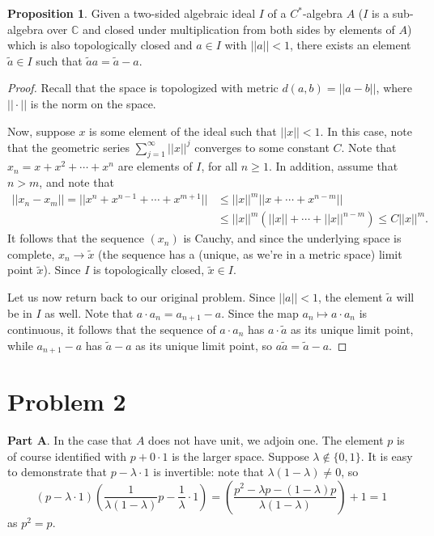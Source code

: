 \documentclass[aps,pra,showpacs,notitlepage,onecolumn,superscriptaddress,nofootinbib]{revtex4-1}
\newcommand{\hhrulefill}{\hspace{-1.0em}\hrulefill}
\theoremstyle{definition}
\newtheorem{proposition}{Proposition}[section]
\begin{document}
\begin{proposition}
  Given a two-sided algebraic ideal $I$ of a $C^{*}$-algebra $A$ ($I$ is a sub-algebra over $\mathbb{C}$ and closed under multiplication from both sides by elements of $A$) which is also topologically closed and $a \in I$ with $||a|| < 1$, there exists an
  element $\widetilde{a} \in I$ such that $\widetilde{a} a = \widetilde{a} - a$.
\end{proposition}

\begin{proof}
  Recall that the space is topologized with metric $d(a, b) = ||a - b||$, where $||\cdot||$ is the norm on the space.

  Now, suppose $x$ is some element of the ideal such that
  $||x|| < 1$. In this case, note that the geometric series $\sum_{j = 1}^{\infty} ||x||^{j}$ converges to some constant $C$.
  Note that $x_n = x + x^2 + \cdots + x^{n}$ are elements of $I$, for all $n \geq 1$. In addition, assume that $n > m$, and note that
  \begin{align}
    ||x_n - x_m|| = ||x^{n} + x^{n - 1} + \cdots + x^{m + 1}|| &\leq ||x||^{m} ||x + \cdots + x^{n - m}||
    \\ & \leq ||x||^{m} (||x|| + \cdots + ||x||^{n - m}) \leq C ||x||^{m}.
  \end{align}
  It follows that the sequence $(x_n)$ is Cauchy, and since the underlying space is complete, $x_n \rightarrow \widetilde{x}$ (the sequence has a (unique, as we're in a metric space) limit point $\widetilde{x}$). Since
  $I$ is topologically closed, $\widetilde{x} \in I$.

  Let us now return back to our original problem. Since $||a|| < 1$, the element $\widetilde{a}$ will be in $I$ as well. Note that $a \cdot a_n = a_{n + 1} - a$. Since the map $a_n \mapsto a \cdot a_n$ is continuous, it
  follows that the sequence of $a \cdot a_n$ has $a \cdot \widetilde{a}$ as its unique limit point, while $a_{n + 1} - a$ has $\widetilde{a} - a$ as its unique limit point, so $a \widetilde{a} = \widetilde{a} - a$.
\end{proof}

\hhrulefill

\section{Problem 2}

\noindent \textbf{Part A}. In the case that $A$ does not have unit, we adjoin one. The element $p$ is of course identified with $p + 0 \cdot 1$ is the larger space.
Suppose $\lambda \notin \{0, 1\}$. It is easy to demonstrate that $p - \lambda \cdot 1$ is invertible: note that $\lambda (1 - \lambda) \neq 0$, so
\begin{equation}
  (p - \lambda \cdot 1) \left( \frac{1}{\lambda (1 - \lambda)} p - \frac{1}{\lambda} \cdot 1 \right) = \left( \frac{p^2 - \lambda p - (1 - \lambda) p}{\lambda (1 - \lambda)} \right) + 1 = 1
\end{equation}
as $p^2 = p$.
\newline
\end{document}
